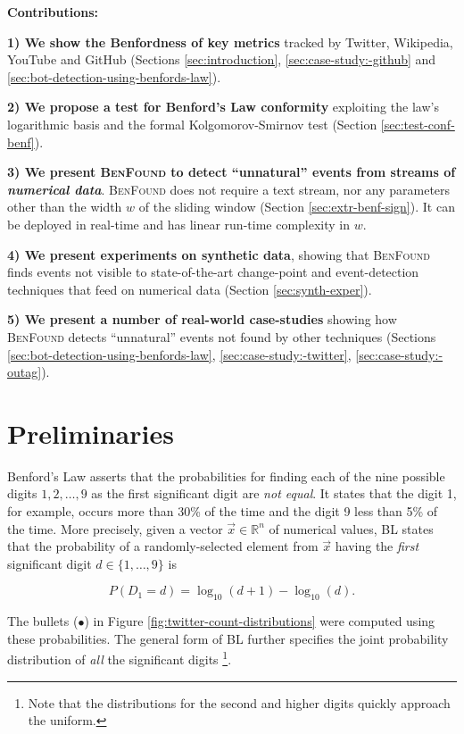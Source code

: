 \documentclass[twoside,leqno,twocolumn]{article}\usepackage[]{graphicx}\usepackage[]{color}
\newcommand{\algoname}{\textsc{BenFound}}
\begin{document}
\noindent \textbf{Contributions:}

\noindent\textbf{1) We show the Benfordness of key metrics} tracked by Twitter, Wikipedia, YouTube and GitHub (Sections \ref{sec:introduction}, \ref{sec:case-study:-github} and \ref{sec:bot-detection-using-benfords-law}).

\noindent\textbf{2) We propose a test for Benford's Law conformity} exploiting the law's logarithmic basis and the formal Kolgomorov-Smirnov test (Section \ref{sec:test-conf-benf}).

\noindent\textbf{3) We present \algoname{} to detect ``unnatural'' events from streams of \textit{numerical data}}. \algoname{} does not require a text stream, nor any parameters other than the width $w$ of the sliding window (Section \ref{sec:extr-benf-sign}). It can be deployed in real-time and has linear run-time complexity in $w$.

\noindent\textbf{4) We present experiments on synthetic data}, showing that \algoname{} finds events not visible to state-of-the-art change-point and event-detection techniques that feed on numerical data (Section \ref{sec:synth-exper}).

\noindent\textbf{5) We present a number of real-world case-studies} showing how \algoname{} detects ``unnatural'' events not found by other techniques (Sections \ref{sec:bot-detection-using-benfords-law}, \ref{sec:case-study:-twitter}, \ref{sec:case-study:-outag}).


\section{Preliminaries}
\label{sec:preliminaries}

Benford's Law asserts that the probabilities for finding each of the nine possible digits $1,2,\ldots,9$ as the first significant digit are \textit{not equal}. It states that the digit 1, for example, occurs more than 30\% of the time and the digit 9 less than 5\% of the time. More precisely, given a vector $\vec{x} \in \mathbb{R}^n$ of numerical values, BL states that the probability of a randomly-selected element from $\vec{x}$ having the \textit{first} significant digit $d \in \{1,\ldots,9\}$ is

\begin{equation}
  \label{eq:bl-first-digit}
  P(D_1 = d) = \log_{10} (d+1) - \log_{10} (d).
\end{equation}

The bullets ($\bullet$) in Figure \ref{fig:twitter-count-distributions} were computed using these probabilities. The general form of BL further specifies the joint probability distribution of \textit{all} the significant digits \cite{berger2015Intro}\footnote{Note that the distributions for the second and higher digits quickly approach the uniform.}. 
\end{document}
